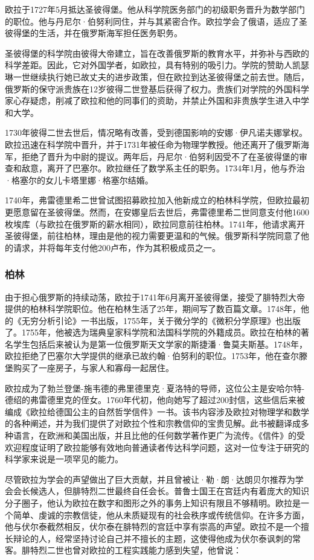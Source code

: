 欧拉于1727年5月抵达圣彼得堡。他从科学院医务部门的初级职务晋升为数学部门的职位。他与丹尼尔·伯努利同住，并与其紧密合作。欧拉学会了俄语，适应了圣彼得堡的生活，并在俄罗斯海军担任医务职务。

圣彼得堡的科学院由彼得大帝建立，旨在改善俄罗斯的教育水平，并弥补与西欧的科学差距。因此，它对外国学者，如欧拉，具有特别的吸引力。学院的赞助人凯瑟琳一世继续执行她已故丈夫的进步政策，但在欧拉到达圣彼得堡之前去世。随后，俄罗斯的保守派贵族在12岁彼得二世登基后获得了权力。贵族们对学院的外国科学家心存疑虑，削减了欧拉和他的同事们的资助，并禁止外国和非贵族学生进入中学和大学。

1730年彼得二世去世后，情况略有改善，受到德国影响的安娜·伊凡诺夫娜掌权。欧拉迅速在科学院中晋升，并于1731年被任命为物理学教授。他还离开了俄罗斯海军，拒绝了晋升为中尉的提议。两年后，丹尼尔·伯努利因受不了在圣彼得堡的审查和敌意，离开了巴塞尔。欧拉继任了数学系主任的职务。1734年1月，他与乔治·格塞尔的女儿卡塔里娜·格塞尔结婚。

1740年，弗雷德里希二世曾试图招募欧拉加入他新成立的柏林科学院，但欧拉最初更愿意留在圣彼得堡。然而，在安娜皇后去世后，弗雷德里希二世同意支付他1600枚埃库（与欧拉在俄罗斯的薪水相同），欧拉同意前往柏林。1741年，他请求离开圣彼得堡，前往柏林，理由是他的视力需要更温和的气候。俄罗斯科学院同意了他的请求，并将每年支付他200卢布，作为其积极成员之一。
\subsubsection{柏林}  
由于担心俄罗斯的持续动荡，欧拉于1741年6月离开圣彼得堡，接受了腓特烈大帝提供的柏林科学院职位。他在柏林生活了25年，期间写了数百篇文章。1748年，他的《无穷分析引论》一书出版，1755年，关于微分学的《微积分学原理》也出版了。1755年，他被选为瑞典皇家科学院和法国科学院的外籍成员。欧拉在柏林的著名学生包括后来被认为是第一位俄罗斯天文学家的斯捷潘·鲁莫夫斯基。1748年，欧拉拒绝了巴塞尔大学提供的继承已故约翰·伯努利的职位。1753年，他在查尔滕堡购买了一座房子，与家人和寡母一起居住。

欧拉成为了勃兰登堡-施韦德的弗里德里克·夏洛特的导师，这位公主是安哈尔特-德绍的弗雷德里克的侄女。1760年代初，他向她写了超过200封信，这些信后来被编成《欧拉给德国公主的自然哲学信件》一书。该书内容涉及欧拉对物理学和数学的各种阐述，并为我们提供了对欧拉个性和宗教信仰的宝贵见解。此书被翻译成多种语言，在欧洲和美国出版，并且比他的任何数学著作更广为流传。《信件》的受欢迎程度证明了欧拉能够有效地向普通读者传达科学问题，这对一位专注于研究的科学家来说是一项罕见的能力。

尽管欧拉为学会的声望做出了巨大贡献，并且曾被让·勒·朗·达朗贝尔推荐为学会会长候选人，但腓特烈二世最终自任会长。普鲁士国王在宫廷内有着庞大的知识分子圈子，他认为欧拉在数字和图形之外的事务上知识有限且不够精明。欧拉是一个简单、虔诚的宗教信徒，他从未质疑现有的社会秩序或传统信仰。在许多方面，他与伏尔泰截然相反，伏尔泰在腓特烈的宫廷中享有崇高的声望。欧拉不是一个擅长辩论的人，经常坚持讨论自己并不擅长的主题，这使得他成为伏尔泰讽刺的常客。腓特烈二世也曾对欧拉的工程实践能力感到失望，他曾说：

